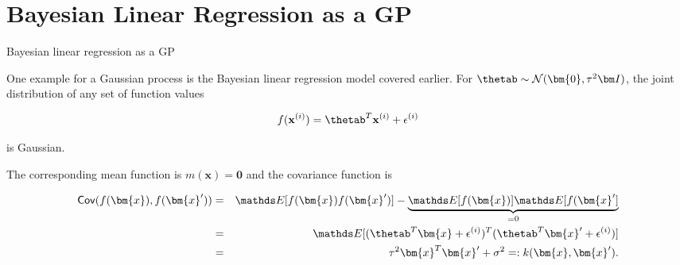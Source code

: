 \section{Bayesian Linear Regression as a GP}


\begin{vbframe}{Bayesian linear regression as a GP}

One example for a Gaussian process is the Bayesian linear regression model covered earlier. For  $\thetab \sim \mathcal{N}(\bm{0}, \tau^2 \id)$, the joint distribution of any set of function values 

$$
f(\xi) = \thetab^T \xi + \epsi
$$

is Gaussian. 

\vspace*{0.3cm}

The corresponding mean function is $m(\bm{x}) = \bm{0}$ and the covariance function is

\vspace*{-0.5cm}

\begin{eqnarray*}
\cov(f(\bm{x}), f(\bm{x}^\prime)) &=& \E[f(\bm{x}) f(\bm{x}^\prime)] - \underbrace{\E[f(\bm{x})] \E[f(\bm{x}^\prime]}_{= 0} \\ &=& \E[(\thetab^T \bm{x} + \epsi)^T(\thetab^T \bm{x}^\prime + \epsi)] \\ &=&  \tau^2 \bm{x}^T\bm{x}^\prime + \sigma^2 =: k(\bm{x}, \bm{x}^\prime).
\end{eqnarray*}

% 
% 
% 
% 
% 

\end{vbframe}

